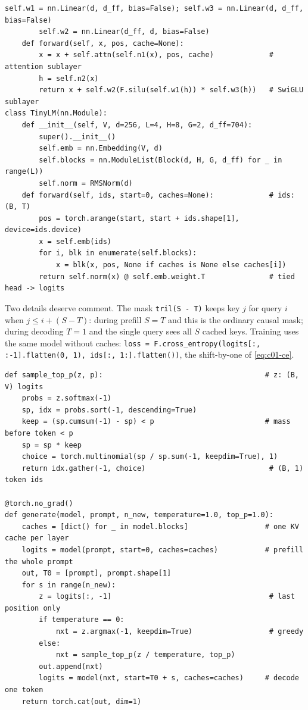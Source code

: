 \begin{lstlisting}[caption={Reference implementation (ours): a minimal decoder-only Transformer with RoPE, GQA, SwiGLU and a KV cache.},label={lst:c01-tinylm}]
        self.w1 = nn.Linear(d, d_ff, bias=False); self.w3 = nn.Linear(d, d_ff, bias=False)
        self.w2 = nn.Linear(d_ff, d, bias=False)
    def forward(self, x, pos, cache=None):
        x = x + self.attn(self.n1(x), pos, cache)             # attention sublayer
        h = self.n2(x)
        return x + self.w2(F.silu(self.w1(h)) * self.w3(h))   # SwiGLU sublayer
class TinyLM(nn.Module):
    def __init__(self, V, d=256, L=4, H=8, G=2, d_ff=704):
        super().__init__()
        self.emb = nn.Embedding(V, d)
        self.blocks = nn.ModuleList(Block(d, H, G, d_ff) for _ in range(L))
        self.norm = RMSNorm(d)
    def forward(self, ids, start=0, caches=None):             # ids: (B, T)
        pos = torch.arange(start, start + ids.shape[1], device=ids.device)
        x = self.emb(ids)
        for i, blk in enumerate(self.blocks):
            x = blk(x, pos, None if caches is None else caches[i])
        return self.norm(x) @ self.emb.weight.T               # tied head -> logits
\end{lstlisting}

Two details deserve comment. The mask \texttt{tril(S - T)} keeps key $j$ for query $i$ when
$j \le i + (S - T)$: during prefill $S = T$ and this is the ordinary causal mask; during
decoding $T = 1$ and the single query sees all $S$ cached keys. Training uses the same
model without caches:
\texttt{loss = F.cross\_entropy(logits[:, :-1].flatten(0, 1), ids[:, 1:].flatten())}, the
shift-by-one of \eqref{eq:c01-ce}.

\begin{lstlisting}[caption={Reference implementation (ours): KV-cache generation with temperature and top-$p$ sampling.},label={lst:c01-generate}]
def sample_top_p(z, p):                                      # z: (B, V) logits
    probs = z.softmax(-1)
    sp, idx = probs.sort(-1, descending=True)
    keep = (sp.cumsum(-1) - sp) < p                          # mass before token < p
    sp = sp * keep
    choice = torch.multinomial(sp / sp.sum(-1, keepdim=True), 1)
    return idx.gather(-1, choice)                             # (B, 1) token ids

@torch.no_grad()
def generate(model, prompt, n_new, temperature=1.0, top_p=1.0):
    caches = [dict() for _ in model.blocks]                  # one KV cache per layer
    logits = model(prompt, start=0, caches=caches)           # prefill the whole prompt
    out, T0 = [prompt], prompt.shape[1]
    for s in range(n_new):
        z = logits[:, -1]                                     # last position only
        if temperature == 0:
            nxt = z.argmax(-1, keepdim=True)                  # greedy
        else:
            nxt = sample_top_p(z / temperature, top_p)
        out.append(nxt)
        logits = model(nxt, start=T0 + s, caches=caches)     # decode one token
    return torch.cat(out, dim=1)
\end{lstlisting}

